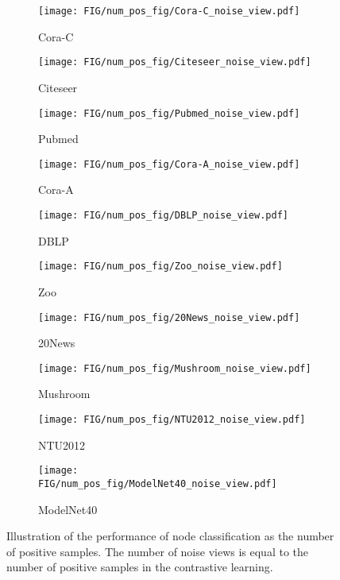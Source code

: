 \begin{figure*}[thbp!]
  \centering
  \begin{subfigure}[b]{0.19\textwidth}
    \texttt{[image: FIG/num\_pos\_fig/Cora-C\_noise\_view.pdf]}
    \caption{Cora-C}
  \end{subfigure}
  \begin{subfigure}[b]{0.19\textwidth}
    \texttt{[image: FIG/num\_pos\_fig/Citeseer\_noise\_view.pdf]}
    \caption{Citeseer}
  \end{subfigure}
  \begin{subfigure}[b]{0.19\textwidth}
    \texttt{[image: FIG/num\_pos\_fig/Pubmed\_noise\_view.pdf]}
    \caption{Pubmed}
  \end{subfigure}
  \begin{subfigure}[b]{0.19\textwidth}
    \texttt{[image: FIG/num\_pos\_fig/Cora-A\_noise\_view.pdf]}
    \caption{Cora-A}
  \end{subfigure}
  \begin{subfigure}[b]{0.19\textwidth}
    \texttt{[image: FIG/num\_pos\_fig/DBLP\_noise\_view.pdf]}
    \caption{DBLP}
  \end{subfigure}
  \begin{subfigure}[b]{0.19\textwidth}
    \texttt{[image: FIG/num\_pos\_fig/Zoo\_noise\_view.pdf]}
    \caption{Zoo}
  \end{subfigure}
  \begin{subfigure}[b]{0.19\textwidth}
    \texttt{[image: FIG/num\_pos\_fig/20News\_noise\_view.pdf]}
    \caption{20News}
  \end{subfigure}
  \begin{subfigure}[b]{0.19\textwidth}
    \texttt{[image: FIG/num\_pos\_fig/Mushroom\_noise\_view.pdf]}
    \caption{Mushroom}
  \end{subfigure}
  \begin{subfigure}[b]{0.19\textwidth}
    \texttt{[image: FIG/num\_pos\_fig/NTU2012\_noise\_view.pdf]}
    \caption{NTU2012}
  \end{subfigure}
  \begin{subfigure}[b]{0.19\textwidth}
    \texttt{[image: FIG/num\_pos\_fig/ModelNet40\_noise\_view.pdf]}
    \caption{ModelNet40}
  \end{subfigure}
  \caption{Illustration of the performance of node classification as the number of positive samples. The number of noise views is equal to the number of positive samples in the contrastive learning.}
  \label{fig:num_pos}
\end{figure*}


